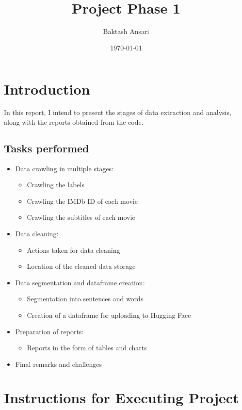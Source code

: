 \documentclass[a4paper]{article}
\title{Project Phase 1}
\author{Baktash Ansari}
\date{\today}
\begin{document}
  

\maketitle



\section{Introduction}


In this report, I intend to present the stages of data extraction and analysis, along with the reports obtained from the code.

\subsection*{Tasks performed}

\begin{itemize}
\item Data crawling in multiple stages:
\begin{itemize}
\item Crawling the labels
\item Crawling the IMDb ID of each movie
\item Crawling the subtitles of each movie
\end{itemize}
\item Data cleaning:
\begin{itemize}
\item Actions taken for data cleaning
\item Location of the cleaned data storage
\end{itemize}
\item Data segmentation and dataframe creation:
\begin{itemize}
\item Segmentation into sentences and words
\item Creation of a dataframe for uploading to Hugging Face
\end{itemize}
\item Preparation of reports:
\begin{itemize}
\item Reports in the form of tables and charts
\end{itemize}
\item Final remarks and challenges
\end{itemize}


\section {Instructions for Executing Project}
\end{document}
